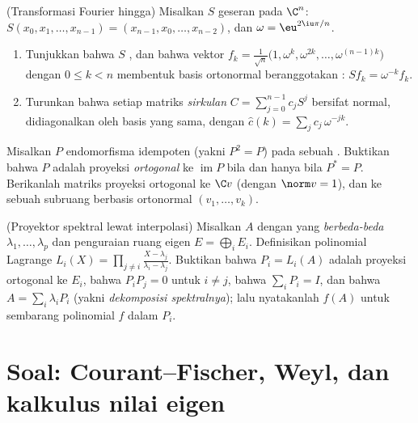 \begin{exercise}[$\star\star$]\label{exo:b2:hermitian:10}
(Transformasi Fourier hingga) Misalkan $S$ geseran  pada
$\C^n$: $S(x_0, x_1, \dots, x_{n-1}) = (x_{n-1}, x_0, \dots,
x_{n-2})$, dan $\omega = \eu^{2\iu\pi/n}$.
\begin{enumerate}
  \item Tunjukkan bahwa $S$ , dan bahwa vektor $f_k =
        \frac{1}{\sqrt n}\bigl(1, \omega^k, \omega^{2k}, \dots,
        \omega^{(n-1)k}\bigr)$ dengan $0 \leq k < n$ membentuk
        basis ortonormal beranggotakan : $Sf_k = \omega^{-k}
        f_k$.
  \item Turunkan bahwa setiap matriks \emph{sirkulan} $C =
        \sum_{j=0}^{n-1} c_jS^j$ bersifat normal, didiagonalkan oleh
        basis yang sama, dengan  $\widehat c(k) = \sum_j
        c_j\,\omega^{-jk}$.
\end{enumerate}
\end{exercise}

\begin{exercise}[$\star\star$]\label{exo:b2:hermitian:11}
Misalkan $P$ endomorfisma idempoten (yakni $P^2 = P$) pada sebuah . Buktikan bahwa $P$ adalah proyeksi \emph{ortogonal} ke
$\operatorname{im} P$ bila dan hanya bila $P^* = P$. Berikanlah matriks
proyeksi ortogonal ke $\C v$ (dengan $\norm v = 1$), dan
ke sebuah subruang berbasis ortonormal $(v_1, \dots, v_k)$.
\end{exercise}

\begin{exercise}[$\star\star\star$]\label{exo:b2:hermitian:12}
(Proyektor spektral lewat interpolasi) Misalkan $A$  dengan
 yang \emph{berbeda-beda} $\lambda_1, \dots, \lambda_p$ dan
penguraian ruang eigen $E = \bigoplus_i E_i$. Definisikan
polinomial Lagrange $L_i(X) = \prod_{j\neq i}\frac{X -
\lambda_j}{\lambda_i - \lambda_j}$. Buktikan bahwa $P_i = L_i(A)$
adalah proyeksi ortogonal ke $E_i$, bahwa $P_iP_j = 0$ untuk
$i \neq j$, bahwa $\sum_i P_i = I$, dan bahwa $A = \sum_i \lambda_iP_i$
(yakni \emph{dekomposisi spektralnya}); lalu nyatakanlah $f(A)$ untuk sembarang
polinomial $f$ dalam $P_i$.
\end{exercise}

\section{Soal: Courant--Fischer, Weyl, dan kalkulus
nilai eigen}

